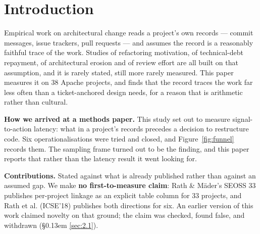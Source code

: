 \documentclass[sigconf,review,anonymous]{acmart}
\begin{document}
\section{Introduction}
\label{sec:1}

Empirical work on architectural change reads a project's own records --- commit messages, issue trackers, pull requests --- and assumes the record is a reasonably faithful trace of the work. Studies of refactoring motivation, of technical-debt repayment, of architectural erosion and of review effort are all built on that assumption, and it is rarely stated, still more rarely measured. This paper measures it on 38 Apache projects, and finds that the record traces the work far less often than a ticket-anchored design needs, for a reason that is arithmetic rather than cultural.

\textbf{How we arrived at a methods paper.} This study set out to measure signal-to-action latency: what in a project's records precedes a decision to restructure code. Six operationalisations were tried and closed, and Figure~\ref{fig:funnel} records them. The sampling frame turned out to be the finding, and this paper reports that rather than the latency result it went looking for.

\textbf{Contributions.} Stated against what is already published rather than against an assumed gap. We make \textbf{no first-to-measure claim}: Rath \& M\"ader's SEOSS 33 \cite{rath2019seoss} publishes per-project linkage as an explicit table column for 33 projects, and Rath et al. (ICSE'18) \cite{rath2018traceability} publishes both directions for six. An earlier version of this work claimed novelty on that ground; the claim was checked, found false, and withdrawn (\S\kern0.13em \ref{sec:2.1}).
\end{document}
